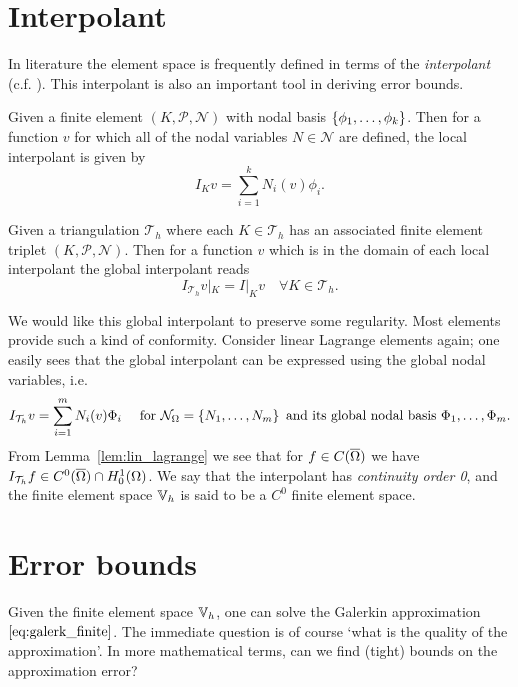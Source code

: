 \documentclass[thesis.tex]{subfiles}
\begin{document}
\section{Interpolant}
\label{sec:apriori}
In literature the element space is frequently defined in terms of the \emph{interpolant} (c.f. \cite[Ch~3]{brenner}). This interpolant is also
  an important tool in deriving error bounds. 
  \begin{defn}
    Given a finite element $(K, \mathcal{P}, \mathcal{N})$ with nodal basis $\set{\phi_1,\dots, \phi_k}$. Then for a function $v$ for which all of the nodal variables $N \in \mathcal{N}$ are defined, the local interpolant is given by
    \[
      I_K v = \sum_{i = 1}^k N_i(v)\phi_i.
    \]
  \end{defn}
  \begin{defn}
    Given a triangulation $\mathcal{T}_h$ where each $K \in \mathcal{T}_h$ has an associated finite element triplet $(K, \mathcal{P}, \mathcal{N})$. Then for
    a function $v$ which is in the domain of each local interpolant the global interpolant reads
    \[
      I_{\mathcal{T}_h} v |_K = I|_K v \quad \forall K \in \mathcal{T}_h.
    \]
  \end{defn}
  We would like this global interpolant to preserve some regularity. Most elements provide such a kind of conformity. Consider
  linear Lagrange elements again; one easily sees that the global interpolant can be expressed using the global nodal variables, i.e.
    \[
      I_{\mathcal{T}_h} v = \sum_{i=1}^m N_i(v)\Phi_i \quad \text{ for } \mathcal{N}_\Omega =\set{N_1, \dots, N_m} \text{ and its global nodal basis } \Phi_1,\dots,\Phi_m.
    \]
    From Lemma~\ref{lem:lin_lagrange} we see that for $f \in C(\overline{\Omega})$ we have $I_{\mathcal{T}_h} f \in C^0(\overline{\Omega}) \cap H_0^1(\Omega)$. We say
    that the interpolant has \emph{continuity order 0}, and the finite element space $\mathbb{V}_h$ is said to be a $C^0$ finite element space.
  \section{Error bounds}
  Given the finite element space $\mathbb{V}_h$, one can solve the Galerkin approximation $\eqref{eq:galerk_finite}$. The immediate
  question is of course `what is the quality of the approximation'. In more mathematical terms, can we find (tight) bounds
  on the approximation error?
\end{document}
